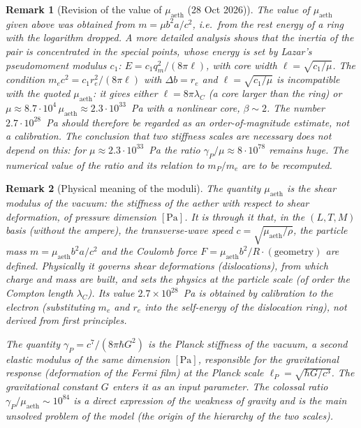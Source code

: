 \documentclass[12pt,a4paper]{article}
\newtheorem{remark}{Remark}
\begin{document}
\begin{remark}[Revision of the value of $\mu_{\text{aeth}}$ (28 Oct 2026)]
The value of $\mu_{\text{aeth}}$ given above was obtained from $m=\mu b^2a/c^2$,
i.e.\ from the rest energy of a ring with the logarithm dropped. A more detailed
analysis shows that the inertia of the pair is concentrated in the special points,
whose energy is set by Lazar's pseudomoment modulus $c_1$:
$E=c_1q_m^2/(8\pi\ell)$, with core width $\ell=\sqrt{c_1/\mu}$. The condition
$m_ec^2=c_1r_e^2/(8\pi\ell)$ with $\Delta b=r_e$ and $\ell=\sqrt{c_1/\mu}$ is
incompatible with the quoted $\mu_{\text{aeth}}$: it gives either
$\ell=8\pi\lambda_C$ (a core larger than the ring) or
$\mu\approx8.7\cdot10^4\,\mu_{\text{aeth}}\approx2.3\cdot10^{33}$~Pa with a nonlinear
core, $\beta\sim2$. The number $2.7\cdot10^{28}$~Pa should therefore be regarded as
an order-of-magnitude estimate, not a calibration. The conclusion that two
stiffness scales are \emph{necessary} does not depend on this: for
$\mu\approx2.3\cdot10^{33}$~Pa the ratio $\gamma_P/\mu\approx8\cdot10^{78}$ remains
huge. The numerical value of the ratio and its relation to $m_P/m_e$ are to be
recomputed.
\end{remark}

\begin{remark}[Physical meaning of the moduli]
The quantity $\mu_{\text{aeth}}$ is the \emph{shear modulus of the vacuum}: the
stiffness of the aether with respect to shear deformation, of pressure
dimension $[\text{Pa}]$. It is through it that, in the $(L,T,M)$ basis (without
the ampere), the transverse-wave speed $c=\sqrt{\mu_{\text{aeth}}/\rho}$, the
particle mass $m=\mu_{\text{aeth}}b^2a/c^2$ and the Coulomb force
$F=\mu_{\text{aeth}}b^2/R\cdot(\text{geometry})$ are defined. Physically it
governs shear deformations (dislocations), from which charge and mass are
built, and sets the physics at the particle scale (of order the Compton length
$\lambda_C$). Its value $2.7\times10^{28}$~Pa is obtained by \emph{calibration}
to the electron (substituting $m_e$ and $r_e$ into the self-energy of the
dislocation ring), not derived from first principles.

The quantity $\gamma_P=c^7/(8\pi\hbar G^2)$ is the \emph{Planck stiffness of the
vacuum}, a second elastic modulus of the same dimension $[\text{Pa}]$,
responsible for the gravitational response (deformation of the Fermi film) at
the Planck scale $\ell_P=\sqrt{\hbar G/c^3}$. The gravitational constant $G$
enters it as an \emph{input} parameter. The colossal ratio
$\gamma_P/\mu_{\text{aeth}}\sim10^{84}$ is a direct expression of the weakness
of gravity and is the main unsolved problem of the model (the origin of the
hierarchy of the two scales).
\end{remark}
\end{document}
